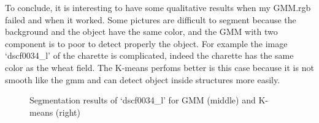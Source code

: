 \documentclass[runningheads,a4paper]{llncs}
\begin{document}
To conclude, it is interesting to have some qualitative results when my GMM.rgb failed and when it worked. 
Some pictures are difficult to segment because the background and the object have the same color, and the GMM with two component is to poor to detect properly the object. For example the image `dscf0034\_l' of the charette is complicated, indeed the charette has the same color as the wheat field. The K-means perfoms better is this case because it is not smooth like the gmm and can detect object inside structures more easily.
\begin{figure}
\centering
{}\qquad
{}\qquad
{}
\caption{Segmentation results of `dscf0034\_l' for GMM (middle) and K-means (right)}
\end{figure}
\end{document}
